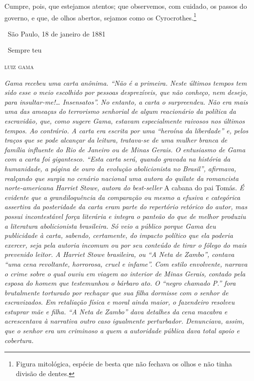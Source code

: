 Cumpre, pois, que estejamos atentos; que observemos, com cuidado, os
passos do governo, e que, de olhos abertos, sejamos como os
Cyrocrothes.\footnote{Figura mitológica, espécie de besta que não 
  fechava os olhos e não tinha divisão de dentes.}\medskip

\hfill\ São Paulo, 18 de janeiro de 1881

\hfill\ Sempre teu

\hfill\textsc{luiz gama}


\begin{resumo}
\emph{Gama recebeu uma carta anônima. ``Não é a primeira. Neste últimos
tempos tem sido esse o meio escolhido por pessoas desprezíveis, que não
conheço, nem desejo, para insultar-me!\ldots{} Insensatos''. No entanto, a
carta o surpreendeu. Não era mais uma das ameaças do terrorismo
senhorial de algum reacionário da política da escravidão, que, como
sugere Gama, estavam especialmente raivosos nos últimos tempos. Ao
contrário. A carta era escrita por uma ``heroína da liberdade'' e, pelos
traços que se pode alcançar da leitura, tratava-se de uma mulher branca
de família influente do Rio de Janeiro ou de Minas Gerais. O entusiasmo
de Gama com a carta foi gigantesco. ``Esta carta será, quando gravada na
história da humanidade, a página de ouro da evolução abolicionista no
Brasil'', afirmava, realçando que surgia no cenário nacional uma autora
do quilate da romancista norte-americana Harriet Stowe, autora do
best-seller} A cabana do pai Tomás. \emph{É evidente que a
grandiloquência da comparação ou mesmo a efusiva e categórica assertiva
da posteridade da carta eram parte do repertório retórico do autor, mas
possui incontestável força
literária e integra o panteão do que de melhor produziu a literatura
abolicionista brasileira. Só veio a público porque Gama deu publicidade à
carta, sabendo, certamente, do impacto político que ela poderia exercer,
seja pela autoria incomum ou por seu conteúdo de tirar o fôlego do mais
prevenido leitor. A Harriet Stowe brasileira, ou ``A Neta de Zambo'',
contava ``uma cena revoltante, horrorosa, cruel e infame''. Com estilo
envolvente, narrava o crime sobre o qual ouviu em viagem ao interior de Minas Gerais, contado pela esposa do homem que
testemunhou o bárbaro ato. O ``negro chamado P.''
fora brutalmente torturado por rechaçar que sua filha dormisse com o
senhor de escravizados. Em retaliação física e moral ainda maior, o
fazendeiro resolveu estuprar mãe e filha. ``A Neta de Zambo'' dava
detalhes da cena macabra e acrescentava à narrativa outro caso
igualmente perturbador. Denunciava, assim, que o senhor era um
criminoso a quem a autoridade pública dava total apoio e cobertura.}
\end{resumo}\pagebreak

